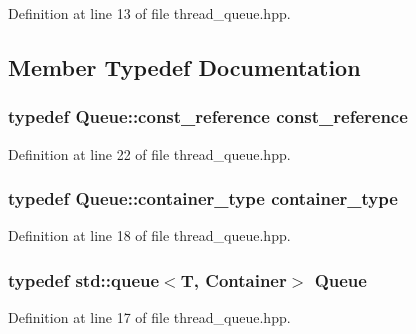 \-Definition at line 13 of file thread\-\_\-queue.\-hpp.



\subsection{\-Member \-Typedef \-Documentation}
\hypertarget{classyuh_1_1thread__queue_aa25405d259f1bdab8c36b1d9f5a444cc}{
\subsubsection[{const\-\_\-reference}]{\setlength{\rightskip}{0pt plus 5cm}typedef \-Queue\-::const\-\_\-reference {\bf const\-\_\-reference}}}\label{d2/d54/classyuh_1_1thread__queue_aa25405d259f1bdab8c36b1d9f5a444cc}


\-Definition at line 22 of file thread\-\_\-queue.\-hpp.

\hypertarget{classyuh_1_1thread__queue_a533ae1bede764ab6e544a525d66d6cea}{
\subsubsection[{container\-\_\-type}]{\setlength{\rightskip}{0pt plus 5cm}typedef \-Queue\-::container\-\_\-type {\bf container\-\_\-type}}}\label{d2/d54/classyuh_1_1thread__queue_a533ae1bede764ab6e544a525d66d6cea}


\-Definition at line 18 of file thread\-\_\-queue.\-hpp.

\hypertarget{classyuh_1_1thread__queue_a7298798dd8d5df210bee3a306107bd43}{
\subsubsection[{\-Queue}]{\setlength{\rightskip}{0pt plus 5cm}typedef std\-::queue$<$\-T, \-Container$>$ {\bf \-Queue}}}\label{d2/d54/classyuh_1_1thread__queue_a7298798dd8d5df210bee3a306107bd43}


\-Definition at line 17 of file thread\-\_\-queue.\-hpp.

